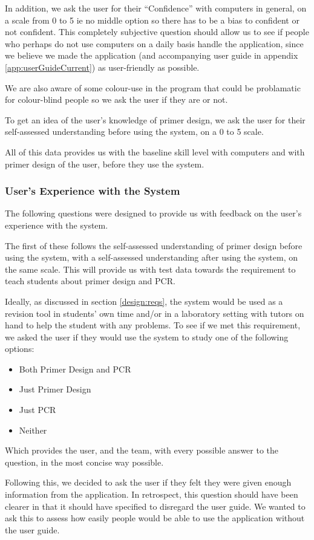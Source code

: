 In addition, we ask the user for their ``Confidence'' with computers
in general, on a scale from 0 to 5 ie no middle option so there has
to be a bias to confident or not confident.
This completely subjective question should allow us to see if people
who perhaps do not use computers on a daily basis handle the
application, since we believe we made the application (and
accompanying user guide in appendix \ref{app:userGuideCurrent}) as
user-friendly as possible.

We are also aware of some colour-use in the program that could be
problamatic for colour-blind people so we ask the user if they are or
not.

To get an idea of the user's knowledge of primer design, we ask the
user for their self-assessed understanding before using the system, on
a 0 to 5 scale.

All of this data provides us with the baseline skill level with
computers and with primer design of the user, before they use the
system.

\subsubsection{User's Experience with the System}
The following questions were designed to provide us with feedback on
the user's experience with the system.

The first of these follows the self-assessed understanding of primer
design before using the system, with a self-assessed understanding
after using the system, on the same scale.
This will provide us with test data towards the requirement to teach
students about primer design and PCR.

Ideally, as discussed in section \ref{design:reqs}, the system would
be used as a revision tool in students' own time and/or in a
laboratory setting with tutors on hand to help the student with any
problems.
To see if we met this requirement, we asked the user if they would use
the system to study one of the following options:
\begin{itemize}
\item Both Primer Design and PCR
\item Just Primer Design
\item Just PCR
\item Neither
\end{itemize}
Which provides the user, and the team, with every possible answer to
the question, in the most concise way possible.

Following this, we decided to ask the user if they felt they were
given enough information from the application.
In retrospect, this question should have been clearer in that it
should have specified to disregard the user guide.
We wanted to ask this to assess how easily people would be able to use
the application without the user guide.

